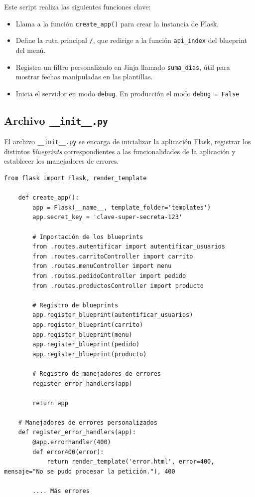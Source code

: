 \documentclass[10pt]{book}
\begin{document}
    Este script realiza las siguientes funciones clave:
    
    \begin{itemize}
      \item Llama a la función \texttt{create\_app()} para crear la instancia de Flask.
      \item Define la ruta principal \texttt{/}, que redirige a la función \texttt{api\_index} del blueprint del menú.
      \item Registra un filtro personalizado en Jinja llamado \texttt{suma\_dias}, útil para mostrar fechas manipuladas en las plantillas.
      \item Inicia el servidor en modo \texttt{debug}. En producción el modo \texttt{debug = False} 
    \end{itemize}
    
\subsection{Archivo \texttt{\_\_init\_\_.py}}
    
    El archivo \texttt{\_\_init\_\_.py} se encarga de inicializar la aplicación Flask, registrar los distintos \textit{blueprints} correspondientes a las funcionalidades de la aplicación y establecer los manejadores de errores.
    
    \begin{lstlisting}[style=pythonclean, caption={Inicialización de la aplicación Flask}]
    from flask import Flask, render_template
    
    def create_app():
        app = Flask(__name__, template_folder='templates')
        app.secret_key = 'clave-super-secreta-123'
        
        # Importación de los blueprints
        from .routes.autentificar import autentificar_usuarios
        from .routes.carritoController import carrito
        from .routes.menuController import menu
        from .routes.pedidoController import pedido
        from .routes.productosController import producto
    
        # Registro de blueprints
        app.register_blueprint(autentificar_usuarios)
        app.register_blueprint(carrito)
        app.register_blueprint(menu)
        app.register_blueprint(pedido)
        app.register_blueprint(producto)
    
        # Registro de manejadores de errores
        register_error_handlers(app)
    
        return app
    
    # Manejadores de errores personalizados
    def register_error_handlers(app):
        @app.errorhandler(400)
        def error400(error):
            return render_template('error.html', error=400, mensaje="No se pudo procesar la petición."), 400
    
        .... Más errores
    \end{lstlisting}
    
\end{document}
